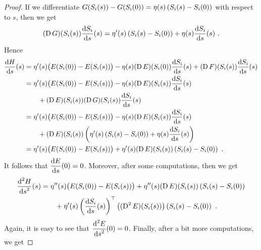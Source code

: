\begin{proof}
If we differentiate $\displaystyle G(S_i(s))-G(S_i(0))
= \eta(s) \left(S_i(s) - S_i(0)\right)$ with respect to $s$, then we get
\[
  (\operatorname{D} G)(S_i(s)) \frac{\mathrm{d}S_i}{\mathrm{d}{s}}(s) = 
\eta'(s) \left(S_i(s) - S_i(0)\right)
+ \eta(s) \frac{\mathrm{d}S_i}{\mathrm{d}{s}}(s) \ .
\]
Hence
\begin{align*}
\frac{\mathrm{d}H}{\mathrm{d}{s}}(s) &= \eta'(s) \big( E(S_i(0)) - E(S_i(s)) \big)
- \eta(s) (\operatorname{D} E)(S_i(0)) \frac{\mathrm{d}S_i}{\mathrm{d}{s}}(s)
+ (\operatorname{D} F)(S_i(s)) \frac{\mathrm{d}S_i}{\mathrm{d}{s}}(s) \\
&= \eta'(s) \big( E(S_i(0)) - E(S_i(s)) \big)
- \eta(s) (\operatorname{D} E)(S_i(s)) \frac{\mathrm{d}S_i}{\mathrm{d}{s}}(s) \\
&\qquad + (\operatorname{D} E)(S_i(s)) (\operatorname{D} G)(S_i(s)) \frac{\mathrm{d}S_i}{\mathrm{d}{s}}(s) \\
&= \eta'(s) \big( E(S_i(0)) - E(S_i(s)) \big)
- \eta(s) (\operatorname{D} E)(S_i(s)) \frac{\mathrm{d}S_i}{\mathrm{d}{s}}(s) \\
&\qquad + (\operatorname{D} E)(S_i(s)) \left( \eta'(s) \left(S_i(s) - S_i(0)\right)
  + \eta(s) \frac{\mathrm{d}S_i}{\mathrm{d}{s}}(s) \right) \\
&= \eta'(s) \big( E(S_i(0)) - E(S_i(s)) \big)
+ \eta'(s) (\operatorname{D} E)(S_i(s)) \left(S_i(s) - S_i(0)\right) \ .
\end{align*}
It follows that $\displaystyle \frac{\mathrm{d}E}{\mathrm{d}{s}}(0) = 0$.  Moreover, after
some computations, then we get
\begin{align*}
\frac{\displaystyle \mathrm{d}^{2}{H}} {\displaystyle \mathrm{d}{s}^{2}}(s)
&= \eta''(s) \big( E(S_i(0)) - E(S_i(s)) \big)
+ \eta''(s) (\operatorname{D} E)(S_i(s)) \left(S_i(s) - S_i(0)\right) \\
&\qquad + \eta'(s)
\left(\frac{\mathrm{d}S_i}{\mathrm{d}{s}}(s)\right)^\top \big((\operatorname{D}^2 E)(S_i(s))\big)
\left(S_i(s)-S_i(0)\right) \ .
\end{align*}
Again, it is easy to see that 
$\displaystyle \frac{\displaystyle \mathrm{d}^{2}{E}} {\displaystyle \mathrm{d}{s}^{2}}(0) = 0$.  Finally, after a bit more
computations, we get

\end{proof}
